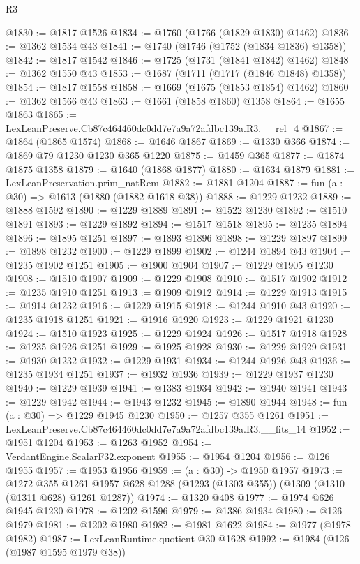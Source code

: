 \begin{lexlean}{R3}
\begin{coremodule}
@1830 := @1817 @1526
@1834 := @1760 (@1766 (@1829 @1830) @1462)
@1836 := @1362 @1534 @43
@1841 := @1740 (@1746 (@1752 (@1834 @1836) @1358))
@1842 := @1817 @1542
@1846 := @1725 (@1731 (@1841 @1842) @1462)
@1848 := @1362 @1550 @43
@1853 := @1687 (@1711 (@1717 (@1846 @1848) @1358))
@1854 := @1817 @1558
@1858 := @1669 (@1675 (@1853 @1854) @1462)
@1860 := @1362 @1566 @43
@1863 := @1661 (@1858 @1860) @1358
@1864 := @1655 @1863
@1865 := LexLeanPreserve.Cb87c464460dc0dd7e7a9a72afdbc139a.R3.__rel_4
@1867 := @1864 (@1865 @1574)
@1868 := @1646 @1867
@1869 := @1330 @366
@1874 := @1869 @79 @1230 @1230 @365 @1220
@1875 := @1459 @365
@1877 := @1874 @1875 @1358
@1879 := @1640 (@1868 @1877)
@1880 := @1634 @1879
@1881 := LexLeanPreservation.prim_natRem
@1882 := @1881 @1204
@1887 := fun (a : @30) => @1613 (@1880 (@1882 @1618 @38))
@1888 := @1229 @1232
@1889 := @1888 @1592
@1890 := @1229 @1889
@1891 := @1522 @1230
@1892 := @1510 @1891
@1893 := @1229 @1892
@1894 := @1517 @1518
@1895 := @1235 @1894
@1896 := @1895 @1251
@1897 := @1893 @1896
@1898 := @1229 @1897
@1899 := @1898 @1232
@1900 := @1229 @1899
@1902 := @1244 @1894 @43
@1904 := @1235 @1902 @1251
@1905 := @1900 @1904
@1907 := @1229 @1905 @1230
@1908 := @1510 @1907
@1909 := @1229 @1908
@1910 := @1517 @1902
@1912 := @1235 @1910 @1251
@1913 := @1909 @1912
@1914 := @1229 @1913
@1915 := @1914 @1232
@1916 := @1229 @1915
@1918 := @1244 @1910 @43
@1920 := @1235 @1918 @1251
@1921 := @1916 @1920
@1923 := @1229 @1921 @1230
@1924 := @1510 @1923
@1925 := @1229 @1924
@1926 := @1517 @1918
@1928 := @1235 @1926 @1251
@1929 := @1925 @1928
@1930 := @1229 @1929
@1931 := @1930 @1232
@1932 := @1229 @1931
@1934 := @1244 @1926 @43
@1936 := @1235 @1934 @1251
@1937 := @1932 @1936
@1939 := @1229 @1937 @1230
@1940 := @1229 @1939
@1941 := @1383 @1934
@1942 := @1940 @1941
@1943 := @1229 @1942
@1944 := @1943 @1232
@1945 := @1890 @1944
@1948 := fun (a : @30) => @1229 @1945 @1230
@1950 := @1257 @355 @1261
@1951 := LexLeanPreserve.Cb87c464460dc0dd7e7a9a72afdbc139a.R3.__fits_14
@1952 := @1951 @1204
@1953 := @1263 @1952
@1954 := VerdantEngine.ScalarF32.exponent
@1955 := @1954 @1204
@1956 := @126 @1955
@1957 := @1953 @1956
@1959 := (a : @30) -> @1950 @1957
@1973 := @1272
    @355
    @1261
    @1957
    @628
    @1288
    (@1293 (@1303 @355))
    (@1309 (@1310 (@1311 @628) @1261 @1287))
@1974 := @1320 @408
@1977 := @1974 @626 @1945 @1230
@1978 := @1202 @1596
@1979 := @1386 @1934
@1980 := @126 @1979
@1981 := @1202 @1980
@1982 := @1981 @1622
@1984 := @1977 (@1978 @1982)
@1987 := LexLeanRuntime.quotient @30 @1628
@1992 := @1984 (@126 (@1987 @1595 @1979 @38))

\end{coremodule}
\end{lexlean}
